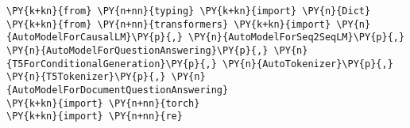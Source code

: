 \documentclass[11pt]{wseas}
\begin{document}
    \newpage

    

    \begin{tcolorbox}[breakable, size=fbox, boxrule=1pt, pad at break*=1mm,colback=cellbackground, colframe=cellborder]
\begin{Verbatim}[commandchars=\\\{\}]
\PY{k+kn}{from} \PY{n+nn}{typing} \PY{k+kn}{import} \PY{n}{Dict}
\PY{k+kn}{from} \PY{n+nn}{transformers} \PY{k+kn}{import} \PY{n}{AutoModelForCausalLM}\PY{p}{,} \PY{n}{AutoModelForSeq2SeqLM}\PY{p}{,} \PY{n}{AutoModelForQuestionAnswering}\PY{p}{,} \PY{n}{T5ForConditionalGeneration}\PY{p}{,} \PY{n}{AutoTokenizer}\PY{p}{,} \PY{n}{T5Tokenizer}\PY{p}{,} \PY{n}{AutoModelForDocumentQuestionAnswering}
\PY{k+kn}{import} \PY{n+nn}{torch}
\PY{k+kn}{import} \PY{n+nn}{re}


\end{Verbatim}
\end{tcolorbox}
\end{document}

